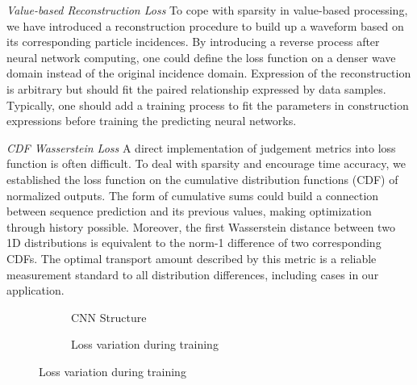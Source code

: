\emph{Value-based Reconstruction Loss}
To cope with sparsity in value-based processing, we have introduced a reconstruction procedure to build up a waveform based on its corresponding particle incidences. By introducing a reverse process after neural network computing, one could define the loss function on a denser wave domain instead of the original incidence domain. Expression of the reconstruction is arbitrary but should fit the paired relationship expressed by data samples. Typically, one should add a training process to fit the parameters in construction expressions before training the predicting neural networks.

\emph{CDF Wasserstein Loss}
A direct implementation of judgement metrics into loss function is often difficult. To deal with sparsity and encourage time accuracy, we established the loss function on the cumulative distribution functions (CDF) of normalized outputs. The form of cumulative sums could build a connection between sequence prediction and its previous values, making optimization through history possible. Moreover, the first Wasserstein distance between two 1D distributions is equivalent to the norm-1 difference of two corresponding CDFs. The optimal transport amount described by this metric is a reliable measurement standard to all distribution differences, including cases in our application.

\begin{figure}[H]
\begin{minipage}[b]{.4\textwidth}
\begin{figure}[H]
    \begin{center}
    \begin{adjustbox}{width=0.6\textwidth}
        
    \end{adjustbox}
    \end{center}
    \caption{\label{fig:struct} CNN Structure}
\end{figure}
\end{minipage}
\begin{minipage}[b]{.6\textwidth}
\begin{figure}[H]
    \centering
    \resizebox{\textwidth}{!}{}
    \caption{\label{fig:loss} Loss variation during training}
\end{figure}
\end{minipage}
\end{figure}

